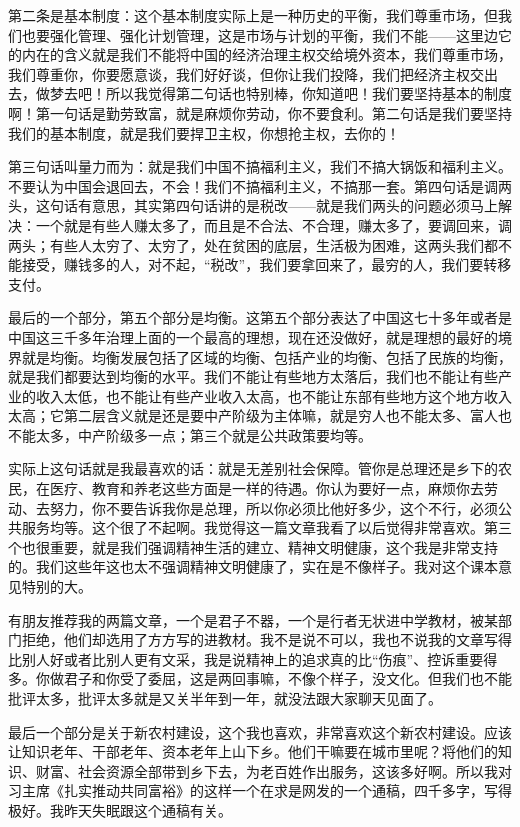 \documentclass[UTF8, 12pt, a4paper]{ctexrep}
\begin{document}
第二条是基本制度：这个基本制度实际上是一种历史的平衡，我们尊重市场，但我们也要强化管理、强化计划管理，这是市场与计划的平衡，我们不能——这里边它的内在的含义就是我们不能将中国的经济治理主权交给境外资本，我们尊重市场，我们尊重你，你要愿意谈，我们好好谈，但你让我们投降，我们把经济主权交出去，做梦去吧！所以我觉得第二句话也特别棒，你知道吧！我们要坚持基本的制度啊！第一句话是勤劳致富，就是麻烦你劳动，你不要食利。第二句话是我们要坚持我们的基本制度，就是我们要捍卫主权，你想抢主权，去你的！

第三句话叫量力而为：就是我们中国不搞福利主义，我们不搞大锅饭和福利主义。不要认为中国会退回去，不会！我们不搞福利主义，不搞那一套。第四句话是调两头，这句话有意思，其实第四句话讲的是税改——就是我们两头的问题必须马上解决：一个就是有些人赚太多了，而且是不合法、不合理，赚太多了，要调回来，调两头；有些人太穷了、太穷了，处在贫困的底层，生活极为困难，这两头我们都不能接受，赚钱多的人，对不起，“税改”，我们要拿回来了，最穷的人，我们要转移支付。

最后的一个部分，第五个部分是均衡。这第五个部分表达了中国这七十多年或者是中国这三千多年治理上面的一个最高的理想，现在还没做好，就是理想的最好的境界就是均衡。均衡发展包括了区域的均衡、包括产业的均衡、包括了民族的均衡，就是我们都要达到均衡的水平。我们不能让有些地方太落后，我们也不能让有些产业的收入太低，也不能让有些产业收入太高，也不能让东部有些地方这个地方收入太高；它第二层含义就是还是要中产阶级为主体嘛，就是穷人也不能太多、富人也不能太多，中产阶级多一点；第三个就是公共政策要均等。

实际上这句话就是我最喜欢的话：就是无差别社会保障。管你是总理还是乡下的农民，在医疗、教育和养老这些方面是一样的待遇。你认为要好一点，麻烦你去劳动、去努力，你不要告诉我你是总理，所以你必须比他好多少，这个不行，必须公共服务均等。这个很了不起啊。我觉得这一篇文章我看了以后觉得非常喜欢。第三个也很重要，就是我们强调精神生活的建立、精神文明健康，这个我是非常支持的。我们这些年这也太不强调精神文明健康了，实在是不像样子。我对这个课本意见特别的大。

有朋友推荐我的两篇文章，一个是君子不器，一个是行者无状进中学教材，被某部门拒绝，他们却选用了方方写的进教材。我不是说不可以，我也不说我的文章写得比别人好或者比别人更有文采，我是说精神上的追求真的比“伤痕”、控诉重要得多。你做君子和你受了委屈，这是两回事嘛，不像个样子，没文化。但我们也不能批评太多，批评太多就是又关半年到一年，就没法跟大家聊天见面了。

最后一个部分是关于新农村建设，这个我也喜欢，非常喜欢这个新农村建设。应该让知识老年、干部老年、资本老年上山下乡。他们干嘛要在城市里呢？将他们的知识、财富、社会资源全部带到乡下去，为老百姓作出服务，这该多好啊。所以我对习主席《扎实推动共同富裕》的这样一个在求是网发的一个通稿，四千多字，写得极好。我昨天失眠跟这个通稿有关。
\end{document}
